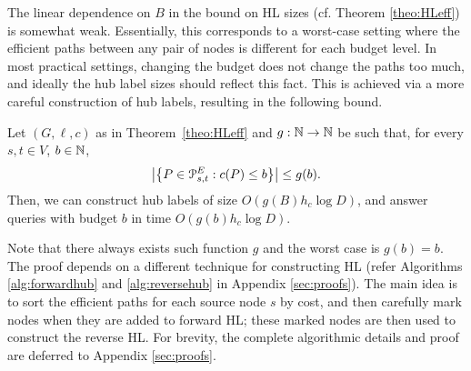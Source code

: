 \label{sec:frontier}

The linear dependence on $B$ in the bound on HL sizes (cf. Theorem \ref{theo:HLeff}) is somewhat weak. Essentially, this corresponds to a worst-case setting where the efficient paths between any pair of nodes is different for each budget level. 
In most practical settings, changing the budget does not change the paths too much, and ideally the hub label sizes should reflect this fact. 
This is achieved via a more careful construction of hub labels, resulting in the following bound. 
\begin{theorem}\label{thm:markedhubs}
Let $(G,\ell,c)$ as in Theorem~\ref{theo:HLeff} and $g:\N\to \N$ be such that, for every $s,t\in V$, $b\in \N$,
\[
\abs*{\crl*{P\in\Pst^E: c(P)\leq b}} \leq g(b).
\]
Then, we can construct hub labels of size $O(g(B)h_c\log D)$, and answer queries with budget $b$ in time $O(g(b)h_c\log D)$.
\end{theorem}

Note that there always exists such function $g$ and the worst case is $g(b)=b$.
The proof depends on a different technique for constructing HL (refer Algorithms \ref{alg:forwardhub} and \ref{alg:reversehub} in Appendix \ref{sec:proofs}). The main idea is to sort the efficient paths for each source node $s$ by cost, and then carefully mark nodes when they are added to forward HL; these marked nodes are then used to construct the reverse HL.
For brevity, the complete algorithmic details and proof are deferred to Appendix \ref{sec:proofs}.